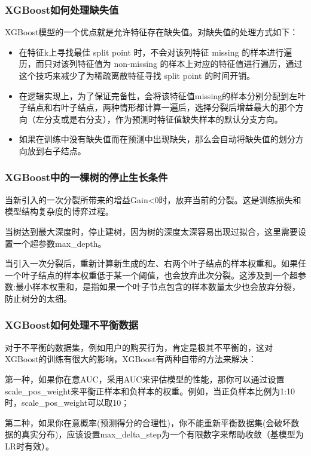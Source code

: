 \documentclass[12pt]{article}
\begin{document}
\subsubsection{XGBoost如何处理缺失值}
XGBoost模型的一个优点就是允许特征存在缺失值。对缺失值的处理方式如下：
\begin{itemize}
\setlength{\itemsep}{0pt}
\setlength{\parsep}{0pt}
\setlength{\parskip}{0pt}
    \item 在特征k上寻找最佳 split point 时，不会对该列特征 missing 的样本进行遍历，而只对该列特征值为 non-missing 的样本上对应的特征值进行遍历，通过这个技巧来减少了为稀疏离散特征寻找 split point 的时间开销。
    \item 在逻辑实现上，为了保证完备性，会将该特征值missing的样本分别分配到左叶子结点和右叶子结点，两种情形都计算一遍后，选择分裂后增益最大的那个方向（左分支或是右分支），作为预测时特征值缺失样本的默认分支方向。
    \item 如果在训练中没有缺失值而在预测中出现缺失，那么会自动将缺失值的划分方向放到右子结点。
\end{itemize}

\subsubsection{XGBoost中的一棵树的停止生长条件}
当新引入的一次分裂所带来的增益Gain<0时，放弃当前的分裂。这是训练损失和模型结构复杂度的博弈过程。

当树达到最大深度时，停止建树，因为树的深度太深容易出现过拟合，这里需要设置一个超参数max\_depth。

当引入一次分裂后，重新计算新生成的左、右两个叶子结点的样本权重和。如果任一个叶子结点的样本权重低于某一个阈值，也会放弃此次分裂。这涉及到一个超参数:最小样本权重和，是指如果一个叶子节点包含的样本数量太少也会放弃分裂，防止树分的太细。

\subsubsection{XGBoost如何处理不平衡数据}
对于不平衡的数据集，例如用户的购买行为，肯定是极其不平衡的，这对XGBoost的训练有很大的影响，XGBoost有两种自带的方法来解决：

第一种，如果你在意AUC，采用AUC来评估模型的性能，那你可以通过设置scale\_pos\_weight来平衡正样本和负样本的权重。例如，当正负样本比例为1:10时，scale\_pos\_weight可以取10；

第二种，如果你在意概率(预测得分的合理性)，你不能重新平衡数据集(会破坏数据的真实分布)，应该设置max\_delta\_step为一个有限数字来帮助收敛（基模型为LR时有效）。
\end{document}
